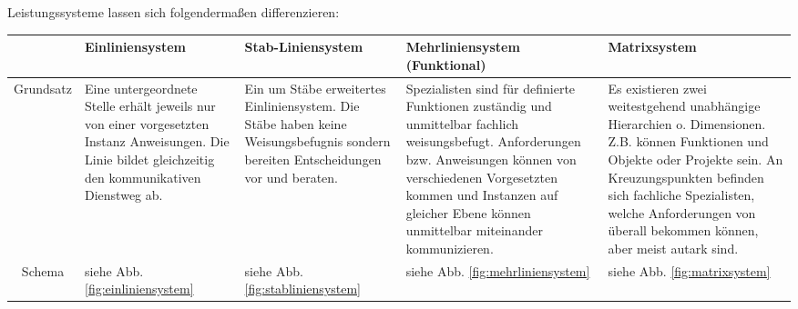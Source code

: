 Leistungssysteme lassen sich folgendermaßen differenzieren:

\begin{table}[H]
    \centering
    \begin{tabularx}{\textwidth}{|c|X|X|X|X|}
        \hline
                   & Einliniensystem                                                                                                                                          & Stab-Liniensystem                                                                                                                 & Mehrliniensystem (Funktional)                                                                                                                                                                                                                             & Matrixsystem                                                                                                                                                                                                                                                        \\
        \hline
        Grundsatz  & Eine untergeordnete Stelle erhält jeweils nur von einer vorgesetzten Instanz Anweisungen. Die Linie bildet gleichzeitig den kommunikativen Dienstweg ab. & Ein um Stäbe erweitertes Einliniensystem. Die Stäbe haben keine Weisungsbefugnis sondern bereiten Entscheidungen vor und beraten. & Spezialisten sind für definierte Funktionen zuständig und unmittelbar fachlich weisungsbefugt. Anforderungen bzw. Anweisungen können von verschiedenen Vorgesetzten kommen und Instanzen auf gleicher Ebene können unmittelbar miteinander kommunizieren. & Es existieren zwei weitestgehend unabhängige Hierarchien o. Dimensionen. Z.B. können Funktionen und Objekte oder Projekte sein. An Kreuzungspunkten befinden sich fachliche Spezialisten, welche Anforderungen von überall bekommen können, aber meist autark sind. \\
        \hline
        Schema     & siehe Abb. \ref{fig:einliniensystem}                                                                                                                     & siehe Abb. \ref{fig:stabliniensystem}                                                                                             & siehe Abb. \ref{fig:mehrliniensystem}                                                                                                                                                                                                                     & siehe Abb. \ref{fig:matrixsystem}                                                                                                                                                                                                                                   \\

\end{tabularx}
\end{table}
